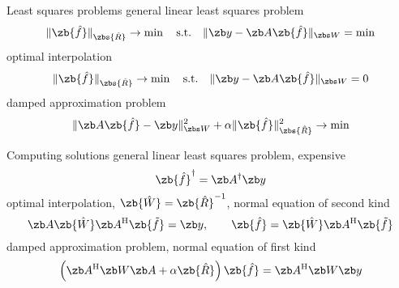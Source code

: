 \newpage
\hypertarget{iNFFT}{}
\vfill
{\color{blue} Least squares problems}
\vfill
general linear least squares problem%
\begin{equation*}
  \|\zb {\hat f}\|_{\zbs {\hat R}} \rightarrow \min \quad \text{s.t.} \quad
  \|\zb y - \zb A \zb {\hat f}\|_{\zbs W}=\min
\end{equation*}
\vfill
optimal interpolation
\begin{equation*}
  \|\zb {\hat f}\|_{\zbs {\hat R}} \rightarrow \min \quad \text{s.t.} \quad
  \|\zb y - \zb A \zb {\hat f}\|_{\zbs W}=0
\end{equation*}
\vfill
damped approximation problem
\begin{equation*}
 \|\zb A \zb {\hat f}-\zb y\|_{\zbs W}^2 + \alpha\|\zb {\hat f}\|_{\zbs {\hat R}}^2 \rightarrow \min
\end{equation*}
\vfill

\newpage
\hypertarget{iNFFT}{}
\vfill
{\color{blue} Computing solutions}
\vfill
general linear least squares problem, expensive
\begin{equation*}
  \zb {\hat f}^{\dagger} =\zb A^{\dagger} \zb y
\end{equation*}
\vfill
optimal interpolation, $\zb {\hat W}=\zb {\hat R}^{-1}$, normal equation of second kind
\begin{equation*}
 \zb A \zb {\hat W} \zb A^{\rm H} \zb {\tilde f}=\zb y,\qquad \zb {\hat f}=\zb {\hat W} \zb A^{\rm H} \zb {\tilde f}
\end{equation*}
\vfill
damped approximation problem, normal equation of first kind
\begin{equation*}
 \left(\zb A^{\rm H} \zb W \zb A + \alpha \zb {\hat R}\right) \zb {\hat f} = \zb A^{\rm H} \zb W \zb y
\end{equation*}
\vfill

